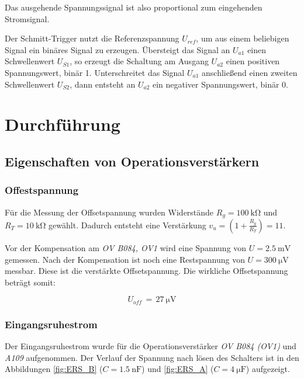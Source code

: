 \documentclass[10pt,a4paper]{scrartcl}
\begin{document}
Das ausgehende Spannungssignal ist also proportional zum eingehenden
Stromsignal.

Der Schmitt-Trigger nutzt die Referenzspannung $U_{ref}$,
um aus einem beliebigen Signal ein binäres Signal zu erzeugen.
Übersteigt das Signal an $U_{a1}$ einen Schwellenwert $U_{S1}$,
so erzeugt die Schaltung am Ausgang $U_{a2}$ einen
positiven Spannungswert, binär 1.
Unterschreitet das Signal $U_{a1}$ anschließend einen zweiten Schwellenwert
$U_{S2}$,
dann entsteht an $U_{a2}$ ein negativer Spannungswert, binär 0.

\pagebreak
\section {Durchführung}

\subsection {Eigenschaften von Operationsverstärkern}

\subsubsection {Offestspannung}

Für die Messung der Offsetspannung wurden Widerstände $R_g=100~\mathrm{k\Omega}$
und $R_T=10~\mathrm{k\Omega}$ gewählt.
Dadurch entsteht eine Verstärkung $v_u=\left(1+\frac{R_g}{R_T}\right)=11$.

Vor der Kompensation am \emph{OV B084, OV1} wird eine Spannung von
$U=2.5~\mathrm{mV}$ gemessen.
Nach der Kompensation ist noch eine Restspannung von $U=300~\mathrm{\mu V}$
messbar.
Diese ist die verstärkte Offsetspannung.
Die wirkliche Offsetspannung beträgt somit:

\begin{equation*}
    U_{off}\,=\,27~\mathrm{\mu V} %
\end{equation*}

\subsubsection {Eingangsruhestrom}

Der Eingangsruhestrom wurde für die Operationsverstärker \emph{OV B084 (OV1)}
und \emph{A109} aufgenommen.
Der Verlauf der Spannung nach lösen des Schalters ist in den Abbildungen
\ref{fig:ERS_B} ($C=1.5~\mathrm{nF}$) und
\ref{fig:ERS_A} ($C=4~\mathrm{\mu F}$) aufgezeigt.
\end{document}

